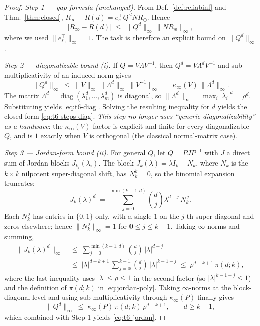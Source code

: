 \iffalse
\begin{proof}
\emph{Step 1 --- gap formula (unchanged).}
From Def.~\ref{def:reliabinf} and Thm.~\ref{thm:closed},
$R_\infty - R(d) = e_{s_0}^\top Q^d N R_\oplus$. Hence
\[
\bigl|R_\infty - R(d)\bigr| \;\le\; \|Q^d\|_\infty\,\|NR_\oplus\|_\infty,
\]
where we used $\|e_{s_0}^\top\|_\infty=1$. The task is therefore an
explicit bound on $\|Q^d\|_\infty$.

\emph{Step 2 --- diagonalizable bound (i).}
If $Q=V\Lambda V^{-1}$, then $Q^d = V\Lambda^d V^{-1}$ and
sub-multiplicativity of an induced norm gives
\[
\|Q^d\|_\infty \;\le\; \|V\|_\infty\,\|\Lambda^d\|_\infty\,\|V^{-1}\|_\infty
                \;=\; \kappa_\infty(V)\,\|\Lambda^d\|_\infty.
\]
The matrix $\Lambda^d=\operatorname{diag}(\lambda_1^d,\dots,\lambda_m^d)$ is
diagonal, so $\|\Lambda^d\|_\infty = \max_i|\lambda_i|^d = \rho^d$.
Substituting yields \eqref{eq:t6-diag}. Solving the resulting
inequality for $d$ yields the closed form \eqref{eq:t6-steps-diag}.
\emph{This step no longer uses ``generic diagonalizability'' as a
handwave}: the $\kappa_\infty(V)$ factor is explicit and finite for
every diagonalizable $Q$, and is $1$ exactly when $V$ is orthogonal
(the classical normal-matrix case).

\emph{Step 3 --- Jordan-form bound (ii).}
For general $Q$, let $Q = P J P^{-1}$ with $J$ a direct sum of Jordan
blocks $J_{k_i}(\lambda_i)$. The block
$J_k(\lambda) = \lambda I_k + N_k$, where $N_k$ is the $k\times k$
nilpotent super-diagonal shift, has $N_k^k = 0$, so the binomial
expansion truncates:
\begin{equation}
J_k(\lambda)^d
  \;=\; \sum_{j=0}^{\min(k-1,d)} \binom{d}{j}\lambda^{d-j}\,N_k^{\,j}.
\label{eq:jordan-expansion}
\end{equation}
Each $N_k^{\,j}$ has entries in $\{0,1\}$ only, with a single $1$ on
the $j$-th super-diagonal and zeros elsewhere; hence $\|N_k^{\,j}\|_\infty
= 1$ for $0\le j\le k-1$. Taking $\infty$-norms and summing,
\begin{align*}
\bigl\|J_k(\lambda)^d\bigr\|_\infty
 &\;\le\; \sum_{j=0}^{\min(k-1,d)} \binom{d}{j}\,|\lambda|^{d-j} \\
 &\;\le\; |\lambda|^{d-k+1}\,\sum_{j=0}^{k-1}\binom{d}{j}\,|\lambda|^{k-1-j}
  \;\le\; \rho^{d-k+1}\,\pi(d;k),
\end{align*}
where the last inequality uses $|\lambda|\le\rho\le 1$ in the second
factor (so $|\lambda|^{k-1-j}\le 1$) and the definition of $\pi(d;k)$ in
\eqref{eq:jordan-poly}. Taking $\infty$-norms at the block-diagonal
level and using sub-multiplicativity through $\kappa_\infty(P)$
finally gives
\[
\|Q^d\|_\infty \;\le\; \kappa_\infty(P)\,\pi(d;k)\,\rho^{d-k+1},
\qquad d\ge k-1,
\]
which combined with Step 1 yields \eqref{eq:t6-jordan}.


\end{proof}
